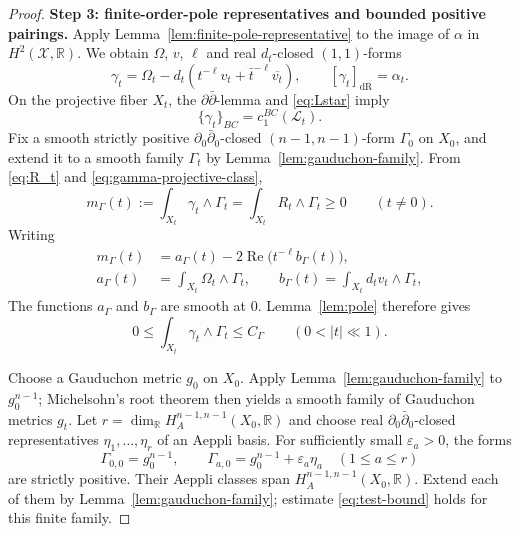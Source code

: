 \documentclass[11pt,letterpaper]{amsart}
\numberwithin{equation}{section}
\newcommand{\RR}{\mathbb{R}}
\newcommand{\cal}{\mathcal}
\def\cL{{\cal L}}
\def\cX{{\cal X}}
\begin{document}
\begin{proof}
\smallskip
\noindent\textbf{Step 3: finite-order-pole representatives and bounded positive pairings.}
Apply Lemma~\ref{lem:finite-pole-representative} to the image of $\alpha$ in $H^2(\cX,\RR)$. We obtain $\Omega$, $v$, $\ell$ and real $d_t$-closed $(1,1)$-forms
\begin{equation}\label{eq:gamma-projective}
 \gamma_t=\Omega_t-d_t(t^{-\ell}v_t+\bar t^{-\ell}\overline{v_t}),
 \qquad [\gamma_t]_{\mathrm{dR}}=\alpha_t.
\end{equation}
On the projective fiber $X_t$, the $\partial\bar\partial$-lemma and
\eqref{eq:Lstar} imply
\begin{equation}\label{eq:gamma-projective-class}
 \{\gamma_t\}_{BC}=c_1^{BC}(\cL_t).
\end{equation}
Fix a smooth strictly positive $\partial_0\bar\partial_0$-closed $(n-1,n-1)$-form $\Gamma_0$ on $X_0$, and extend it to a smooth family $\Gamma_t$ by Lemma~\ref{lem:gauduchon-family}. From
\eqref{eq:R_t} and \eqref{eq:gamma-projective-class},
\begin{equation}\label{eq:test-positive}
 m_\Gamma(t):=\int_{X_t}\gamma_t\wedge\Gamma_t
 =\int_{X_t}R_t\wedge\Gamma_t\ge0
 \qquad(t\ne0).
\end{equation}
Writing
\begin{align}\label{eq:test-pole}
 m_\Gamma(t)
 &=a_\Gamma(t)-2\operatorname{Re}\bigl(t^{-\ell}b_\Gamma(t)\bigr),\\
 a_\Gamma(t)&=\int_{X_t}\Omega_t\wedge\Gamma_t,\qquad
 b_\Gamma(t)=\int_{X_t}d_tv_t\wedge\Gamma_t,\nonumber
\end{align}
The functions $a_\Gamma$ and $b_\Gamma$ are smooth at $0$. Lemma~\ref{lem:pole}
therefore gives
\begin{equation}\label{eq:test-bound}
 0\le\int_{X_t}\gamma_t\wedge\Gamma_t\le C_\Gamma
 \qquad(0<|t|\ll1).
\end{equation}

Choose a Gauduchon metric $g_0$ on $X_0$. Apply Lemma~\ref{lem:gauduchon-family} to $g_0^{n-1}$; Michelsohn's root theorem \cite{Michelsohn82} then yields a smooth family of Gauduchon metrics $g_t$. Let
$r=\dim_\RR H_A^{n-1,n-1}(X_0,\RR)$ and choose real
$\partial_0\bar\partial_0$-closed representatives
$\eta_1,\ldots,\eta_r$ of an Aeppli basis. For sufficiently small
$\varepsilon_a>0$, the forms
\[
 \Gamma_{0,0}=g_0^{n-1},\qquad
 \Gamma_{a,0}=g_0^{n-1}+\varepsilon_a\eta_a\quad(1\le a\le r)
\]
are strictly positive. Their Aeppli classes span
$H_A^{n-1,n-1}(X_0,\RR)$. Extend each of them by
Lemma~\ref{lem:gauduchon-family}; estimate \eqref{eq:test-bound} holds for this
finite family.


\end{proof}
\end{document}
